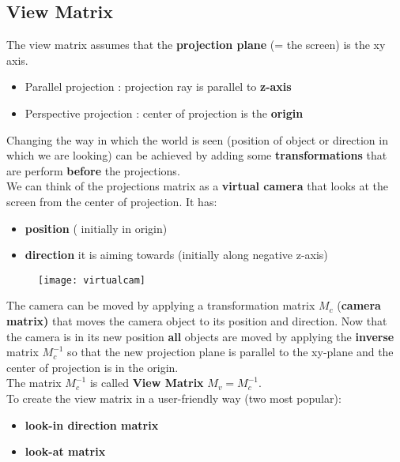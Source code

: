 \subsection{View Matrix}
The view matrix assumes that the \textbf{projection plane} (= the screen) is the xy axis.
\begin{itemize}
\item Parallel projection : projection ray is parallel to \textbf{z-axis}
\item Perspective projection : center of projection is the \textbf{origin}
\end{itemize}
Changing the way in which the world is seen (position of object or direction in which we are looking) can be achieved by adding some \textbf{transformations} that are perform \textbf{before} the projections.\\
We can think of the projections matrix as a \textbf{virtual camera} that looks at the screen from the center of projection. It has:
\begin{itemize}
\item \textbf{position} ( initially in origin)
\item \textbf{direction} it is aiming towards (initially along negative z-axis)
\end{itemize}
\begin{figure}[H]
  \centering
  \texttt{[image: virtualcam]}
\end{figure}
The camera can be moved by applying a transformation matrix $M_c$ (\textbf{camera matrix)} that moves the camera object to its position and direction.
Now that the camera is in its new position \textbf{all} objects are moved by applying the \textbf{inverse} matrix $M_c^{-1}$ so that the new projection plane is parallel to the xy-plane and the center of projection is in the origin.\\
The matrix $M_c^{-1}$ is called \textbf{View Matrix} $M_v = M_c^{-1}$.\\
To create the view matrix in a user-friendly way (two most popular):
\begin{itemize}
\item \textbf{look-in direction matrix}
\item \textbf{look-at matrix}
\end{itemize}

